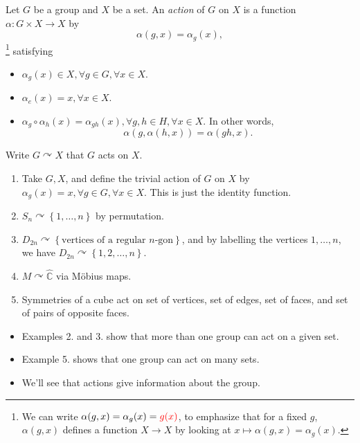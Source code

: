 \documentclass[a4paper]{article}
\newcommand{\redcomment}[1]{{\color{red}#1}}
\begin{document}
        \begin{definition}
            Let $ G $ be a group and $X$ be a set. An \textit{action} of $G$ on $X$ is a function $ \alpha: G \times X\to X $ by 
            \[
                \alpha(g,x)=\alpha_g(x)
            ,\]
            \footnote{We can write $ \alpha(g,x) =\alpha_g(x)=\redcomment{g(x)}$, to emphasize that for a fixed $g$, $ \alpha(g,x) $ defines a function $ X \to X $ by looking at $ x \mapsto \alpha(g,x)=\alpha_g(x) $.}
            satisfying 
            \begin{itemize}
                \item $ \alpha_g(x)\in X, \forall g\in G, \forall x\in X $.
                \item $ \alpha_e(x)=x, \forall x\in X $.
                \item $ \alpha_g \circ \alpha_h(x)=\alpha_{gh}(x), \forall g,h\in H, \forall x\in X $. In other words, 
                \[
                    \alpha(g,\alpha(h,x))=\alpha(gh,x)
                .\]
            \end{itemize}
            Write $ G\curvearrowright X $ that $ G $ acts on $X$.
        \end{definition}
        \begin{example}
            \begin{enumerate}
                \item Take $G,X$, and define the trivial action of $G$ on $X$ by $ \alpha_g(x)=x, \forall g\in G, \forall x\in X $. This is just the identity function.
                \item $ S_n \curvearrowright \left\{ 1,\dots,n\right\} $ by permutation.
                \item $ D_{2n} \curvearrowright \left\{ \text{vertices of a regular $n$-gon}\right\} $, and by labelling the vertices $ 1,\dots, n $, we have $ D_{2n} \curvearrowright \left\{ 1,2,\dots,n\right\} $.
                \item $ M \curvearrowright \hat{\mathbb{C}} $ via M\"{o}bius maps.
                \item Symmetries of a cube act on set of vertices, set of edges, set of faces, and set of pairs of opposite faces.
            \end{enumerate}
        \end{example}
        \begin{remark}
            \begin{itemize}
                \item Examples 2. and 3. show that more than one group can act on a given set.
                \item Example 5. shows that one group can act on many sets.
                \item We'll see that actions give information about the group.
            \end{itemize}
        \end{remark}
\end{document}
